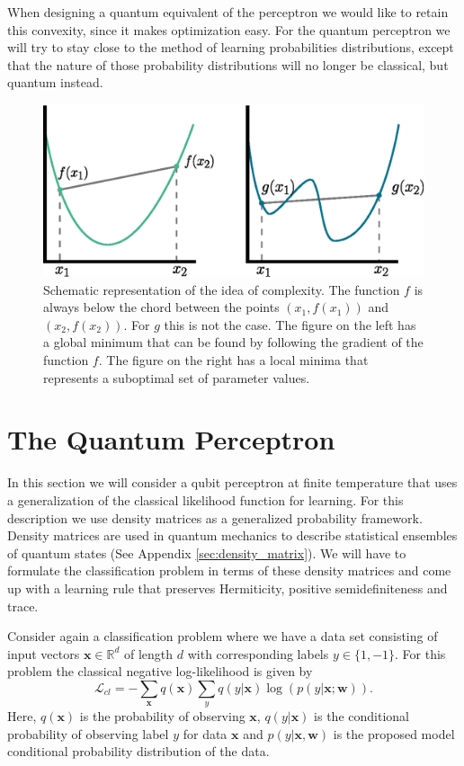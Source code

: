 \noindent When designing a quantum equivalent of the perceptron we would like to retain this convexity, since it makes optimization easy. For the quantum perceptron we will try to stay close to the method of learning probabilities distributions, except that the nature of those probability distributions will no longer be classical, but quantum instead.
\begin{figure}[htb!]
    \centering
    \includegraphics[width=\textwidth]{figures/chapter3/convex.eps}
    \caption{Schematic representation of the idea of complexity. The function $f$ is always below the chord between the points $(x_1, f(x_1))$  and $(x_2, f(x_2))$. For $g$ this is not the case. The figure on the left has a global minimum that can be found by following the gradient of the function $f$. The figure on the right has a local minima that represents a suboptimal set of parameter values.}
    \label{fig:convex}
\end{figure}

\section{The Quantum Perceptron}\label{sec:qperceptron}

In this section we will consider a qubit perceptron at finite temperature that uses a generalization of the classical likelihood function for learning. For this description we use density matrices as a generalized probability framework. Density matrices are used in quantum mechanics to describe statistical ensembles of quantum states (See Appendix \ref{sec:density_matrix}). We will have to formulate the classification problem in terms of these density matrices and come up with a learning rule that preserves Hermiticity, positive semidefiniteness and trace. \newline

\noindent Consider again a classification problem where we have a data set consisting of input vectors $\mathbf{x}\in \mathbb{R}^d$ of length $d$ with corresponding labels $y\in \{1,-1\}$. For this problem the classical negative log-likelihood is given by
\begin{equation}
   \mathcal{L}_{cl} = -\sum_{\mathbf{x}} q(\mathbf{x}) \sum_y q(y|\mathbf{x})\log(p(y|\mathbf{x}; \mathbf{w})).
\label{eq:cl_lh}
\end{equation}
Here, $q(\mathbf{x})$ is the probability of observing $\mathbf{x}$, $q(y|\mathbf{x})$ is the conditional probability of observing label $y$ for data $\mathbf{x}$ and $p(y|\mathbf{x}, \mathbf{w})$ is the proposed model conditional probability distribution of the data.

